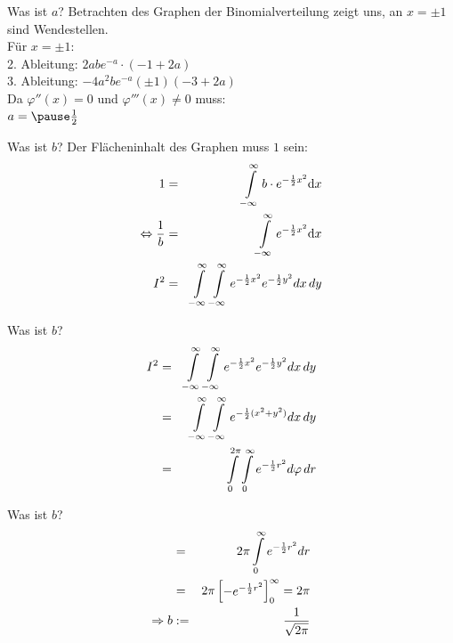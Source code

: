 \documentclass[14pt]{beamer}
\begin{document}
\begin{frame}{Was ist $a$?}
Betrachten des Graphen der Binomialverteilung zeigt uns, an $x=\pm 1$ sind Wendestellen.\\
Für $x=\pm 1$:\\
2. Ableitung: $2abe^{-a} \cdot (-1+2 a)$\\
3. Ableitung: $-4 a^{2} b e^{-a} (\pm1) (-3+2 a)$\\

Da $\varphi''(x)=0$ und $\varphi'''(x)\neq0$ muss:\\
$a=\pause\frac{1}{2}$
\end{frame}

\begin{frame}{Was ist $b$?}
Der Flächeninhalt des Graphen muss $1$ sein:
\begin{eqnarray}
1&=&\int\displaylimits^{\infty}_{-\infty} b \cdot e^{-\frac{1}{2}x^2} {\mathrm d}x \\
\Leftrightarrow \frac{1}{b}&=&\int\displaylimits^{\infty}_{-\infty} e^{-\frac{1}{2}x^2} {\mathrm d}x \\
I^2 &=& \int\displaylimits^{\infty}_{-\infty} \int\displaylimits^{\infty}_{-\infty} e^{-\frac{1}{2}x^2} e^{-\frac{1}{2}y^2} dx \, dy
\end{eqnarray}
\end{frame}

\begin{frame}[allowframebreaks]{Was ist $b$?}
\small
\begin{eqnarray}
I^2 &=& \int\displaylimits^{\infty}_{-\infty} \int\displaylimits^{\infty}_{-\infty} e^{-\frac{1}{2}x^2} e^{-\frac{1}{2}y^2} dx \, dy \\
&=& \int\displaylimits^{\infty}_{-\infty} \int\displaylimits^{\infty}_{-\infty} e^{-\frac{1}{2}(x^2 + y^2)} dx \, dy \\ 
&=& \int\displaylimits^{2 \pi}_{0} \int\displaylimits^{\infty}_{0} e^{-\frac{1}{2}r^2} d\varphi \, dr
\end{eqnarray}
\end{frame}

\begin{frame}[allowframebreaks]{Was ist $b$?}
\small
\begin{eqnarray}
&=& 2 \pi \int\displaylimits^{\infty}_{0} e^{-\frac{1}{2}r^2} dr \\
&=& 2 \pi \begin{bmatrix}-e^{-\frac{1}{2} r^2} \end{bmatrix}^\infty_0 = 2 \pi\\
\Rightarrow b&:=&\frac{1}{\sqrt{2\pi}}
\end{eqnarray}
\end{frame}
\end{document}
